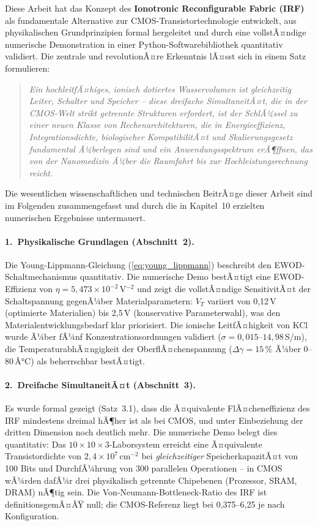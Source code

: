﻿\documentclass[a4paper,12pt]{scrreprt}
\theoremstyle{definition}
\begin{document}
Diese Arbeit hat das Konzept des \textbf{Ionotronic Reconfigurable Fabric (IRF)}
als fundamentale Alternative zur CMOS-Transistortechnologie entwickelt,
aus physikalischen Grundprinzipien formal hergeleitet und durch eine
vollstÃ¤ndige numerische Demonstration in einer Python-Softwarebibliothek
quantitativ validiert. Die zentrale und revolutionÃ¤re Erkenntnis
lÃ¤sst sich in einem Satz formulieren:

\begin{quote}
	\emph{Ein hochleitfÃ¤higes, ionisch dotiertes Wasservolumen ist
		gleichzeitig Leiter, Schalter und Speicher -- diese dreifache
		SimultaneitÃ¤t, die in der CMOS-Welt strikt getrennte Strukturen
		erfordert, ist der SchlÃ¼ssel zu einer neuen Klasse von
		Rechenarchitekturen, die in Energieeffizienz, Integrationsdichte,
		biologischer KompatibilitÃ¤t und Skalierungsgesetz fundamental
		Ã¼berlegen sind und ein Anwendungsspektrum erÃ¶ffnen, das von der
		Nanomedizin Ã¼ber die Raumfahrt bis zur Hochleistungsrechnung reicht.}
\end{quote}

Die wesentlichen wissenschaftlichen und technischen BeitrÃ¤ge dieser
Arbeit sind im Folgenden zusammengefasst und durch die in Kapitel~10
erzielten numerischen Ergebnisse untermauert.

\paragraph{1.~Physikalische Grundlagen (Abschnitt~2).}
Die Young-Lippmann-Gleichung (\ref{eq:young_lippmann}) beschreibt
den EWOD-Schaltmechanismus quantitativ. Die numerische Demo bestÃ¤tigt
eine EWOD-Effizienz von $\eta = 5{,}473 \times 10^{-2}$\,V$^{-2}$ und
zeigt die vollstÃ¤ndige SensitivitÃ¤t der Schaltspannung gegenÃ¼ber
Materialparametern: $V_T$ variiert von 0,12\,V (optimierte Materialien)
bis 2,5\,V (konservative Parameterwahl), was den
Materialentwicklungsbedarf klar priorisiert. Die ionische
LeitfÃ¤higkeit von KCl wurde Ã¼ber fÃ¼nf Konzentrationsordnungen validiert
($\sigma = 0{,}015$--$14{,}98$\,S/m), die TemperaturabhÃ¤ngigkeit der
OberflÃ¤chenspannung ($\Delta\gamma = 15\,\%$ Ã¼ber 0--80\,Â°C) als
beherrschbar bestÃ¤tigt.

\paragraph{2.~Dreifache SimultaneitÃ¤t (Abschnitt~3).}
Es wurde formal gezeigt (Satz~3.1), dass die Ã¤quivalente FlÃ¤cheneffizienz
des IRF mindestens dreimal hÃ¶her ist als bei CMOS, und unter
Einbeziehung der dritten Dimension noch deutlich mehr. Die numerische
Demo belegt dies quantitativ: Das $10 \times 10 \times 3$-Laborsystem
erreicht eine Ã¤quivalente Transistordichte von $2{,}4 \times 10^7$\,cm$^{-2}$
bei \emph{gleichzeitiger} SpeicherkapazitÃ¤t von 100 Bits und
DurchfÃ¼hrung von 300 parallelen Operationen -- in CMOS wÃ¼rden dafÃ¼r
drei physikalisch getrennte Chipebenen (Prozessor, SRAM, DRAM) nÃ¶tig
sein. Die Von-Neumann-Bottleneck-Ratio des IRF ist definitionsgemÃ¤ÃŸ
null; die CMOS-Referenz liegt bei 0,375--6,25 je nach Konfiguration.
\end{document}
